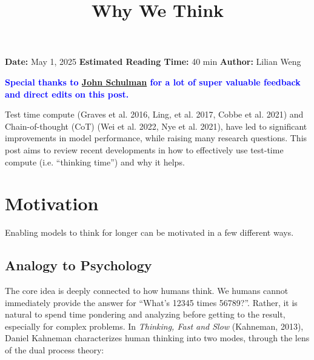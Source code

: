 \documentclass[12pt]{article}
\title{Why We Think}
\begin{document}
\maketitle

\begin{center}
    \textbf{Date:} May 1, 2025 \quad
    \textbf{Estimated Reading Time:} 40 min \quad
    \textbf{Author:} Lilian Weng
\end{center}


\noindent
\textcolor{blue}{\textbf{Special thanks to \href{https://twitter.com/jesse\_john\_schulman}{John Schulman} for a lot of super valuable feedback and direct edits on this post.}}

Test time compute (Graves et al. 2016, Ling, et al. 2017, Cobbe et al. 2021) and Chain-of-thought (CoT) (Wei et al. 2022, Nye et al. 2021), have led to significant improvements in model performance, while raising many research questions. This post aims to review recent developments in how to effectively use test-time compute (i.e. ``thinking time'') and why it helps.

\section{Motivation}

Enabling models to think for longer can be motivated in a few different ways.

\subsection{Analogy to Psychology}

The core idea is deeply connected to how humans think. We humans cannot immediately provide the answer for ``What's 12345 times 56789?''. Rather, it is natural to spend time pondering and analyzing before getting to the result, especially for complex problems. In \emph{Thinking, Fast and Slow} (Kahneman, 2013), Daniel Kahneman characterizes human thinking into two modes, through the lens of the dual process theory:
\end{document}
